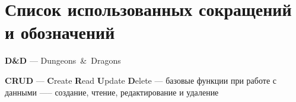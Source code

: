 \section*{Список использованных сокращений и обозначений}

\textbf{D\&D} --- Dungeons~\&~Dragons

\textbf{CRUD} --- \textbf{C}reate \textbf{R}ead \textbf{U}pdate \textbf{D}elete --- базовые функции при работе с данными —-- создание, чтение, редактирование и удаление

\pagebreak
